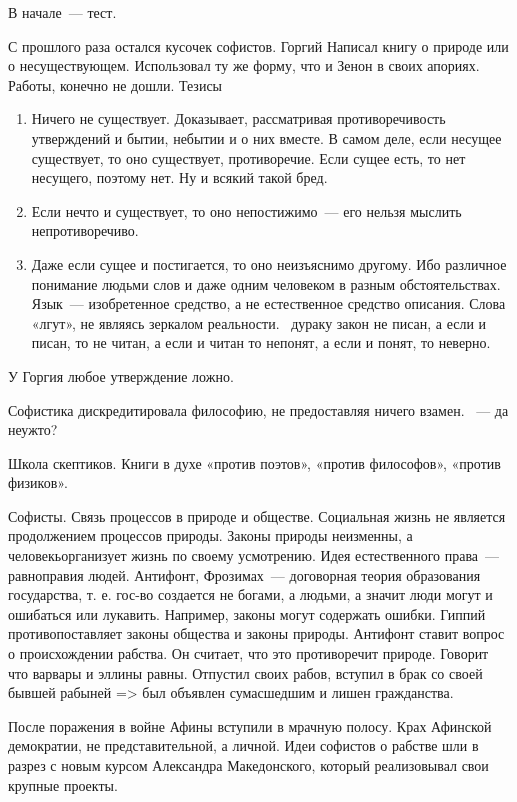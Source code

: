 В начале~--- тест. 

С прошлого раза остался кусочек софистов. 
Горгий 
Написал книгу о природе или о несуществующем. Использовал ту же форму, что и Зенон в своих апориях. Работы, конечно не дошли. 
Тезисы

\begin{enumerate}
	\item Ничего не существует. Доказывает, рассматривая противоречивость утверждений и бытии, небытии и о них вместе. 
	В самом деле, если несущее существует, то оно существует, противоречие. Если сущее есть, то нет несущего, поэтому нет. Ну и всякий такой бред. 
	\item Если нечто и существует, то оно непостижимо~--- его нельзя мыслить непротиворечиво. 
	\item Даже если сущее и постигается, то оно неизъяснимо другому. Ибо различное понимание людьми слов и даже одним человеком в разным обстоятельствах. 
	Язык~--- изобретенное средство, а не естественное средство описания. Слова «лгут», не являясь зеркалом реальности. ~дураку закон не писан, а если и писан, то не читан, а если и читан то непонят, а если и понят, то неверно. 
\end{enumerate}

У Горгия любое утверждение ложно. 

Софистика дискредитировала философию, не предоставляя ничего взамен. ~--- да неужто?

Школа скептиков. Книги в духе «против поэтов», «против философов», «против физиков». 

Софисты. 
Связь процессов в природе и обществе. Социальная жизнь не является продолжением процессов природы. Законы природы неизменны, а человекьорганизует жизнь по своему усмотрению. 
Идея естественного права~--- равноправия людей. Антифонт, Фрозимах~--- договорная теория образования государства, т. е. гос-во создается не богами, а людьми, а значит люди могут и ошибаться или лукавить. Например, законы могут содержать ошибки. 
Гиппий противопоставляет законы общества и законы природы. Антифонт ставит вопрос о происхождении рабства. 
Он считает, что это противоречит природе. Говорит что варвары и эллины равны. 
Отпустил своих рабов, вступил в брак со своей бывшей рабыней => был объявлен сумасшедшим и лишен гражданства. 

После поражения в войне Афины вступили в мрачную полосу. Крах Афинской демократии, не представительной, а личной. Идеи софистов о рабстве шли в разрез с новым курсом Александра Македонского, который реализовывал свои крупные проекты. 

